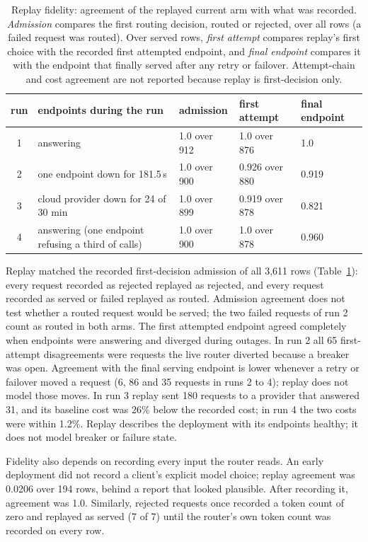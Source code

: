 \documentclass[11pt]{article}
\begin{document}
\begin{table}[t]
\centering
\small
\caption{Replay fidelity: agreement of the replayed current arm with what was recorded.
\emph{Admission} compares the first routing decision, routed or rejected, over all rows (a
failed request was routed). Over served rows, \emph{first attempt} compares replay's first
choice with the recorded first attempted endpoint, and \emph{final endpoint} compares it with
the endpoint that finally served after any retry or failover. Attempt-chain and cost agreement
are not reported because replay is first-decision only.}
\label{tab:fidelity}
\begin{tabular}{@{}cp{5.2cm}lll@{}}
\toprule
run & endpoints during the run & admission & first attempt & final endpoint \\
\midrule
1 & answering & 1.0 over 912 & 1.0 over 876 & 1.0 \\
2 & one endpoint down for 181.5\,s & 1.0 over 900 & 0.926 over 880 & 0.919 \\
3 & cloud provider down for 24 of 30 min & 1.0 over 899 & 0.919 over 878 & 0.821 \\
4 & answering (one endpoint refusing a third of calls) & 1.0 over 900 & 1.0 over 878 & 0.960 \\
\bottomrule
\end{tabular}
\end{table}

Replay matched the recorded first-decision admission of all 3{,}611 rows
(Table~\ref{tab:fidelity}): every request recorded as rejected replayed as rejected, and every
request recorded as served or failed replayed as routed. Admission agreement does not test
whether a routed request would be served; the two failed requests of run 2 count as routed in
both arms. The first attempted endpoint agreed completely when endpoints were answering and
diverged during outages. In run 2 all 65 first-attempt disagreements were requests the live
router diverted because a breaker was open. Agreement with the final serving endpoint is lower
whenever a retry or failover moved a request (6, 86 and 35 requests in runs 2 to 4); replay does
not model those moves. In run
3 replay sent 180 requests to a provider that answered 31, and its baseline cost was 26\% below
the recorded cost; in run 4 the two costs were within 1.2\%. Replay describes the deployment
with its endpoints healthy; it does not model breaker or failure state.

Fidelity also depends on recording every input the router reads. An early deployment did not
record a client's explicit model choice; replay agreement was 0.0206 over 194 rows, behind a
report that looked plausible. After recording it, agreement was 1.0. Similarly, rejected
requests once recorded a token count of zero and replayed as served (7 of 7) until the router's
own token count was recorded on every row.
\end{document}
